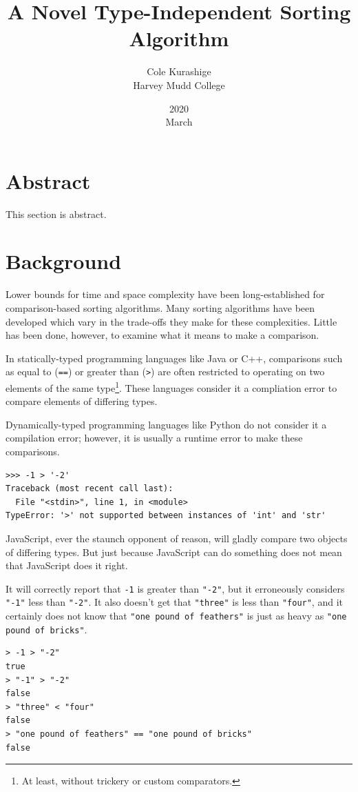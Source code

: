 \documentclass{article}
\title{A Novel Type-Independent Sorting Algorithm}
\author{Cole Kurashige \\ Harvey Mudd College}
\date{2020 \\ March}
\begin{document}
\section{Abstract}
This section is abstract.

\section{Background}
Lower bounds for time and space complexity have been long-established for
comparison-based sorting algorithms. Many sorting algorithms have been developed
which vary in the trade-offs they make for these complexities. Little has been
done, however, to examine what it means to make a comparison.

In statically-typed programming languages like Java or C++, comparisons such as
equal to (\texttt{==}) or greater than (\texttt{>}) are often restricted to
operating on two elements of the same type\footnote{At least, without trickery
  or custom comparators.}. These languages consider it a compliation error
to compare elements of differing types.

Dynamically-typed programming languages like Python do not consider it a
compilation error; however, it is usually a runtime error to make these
comparisons.

\begin{lstlisting}[caption = Comparisons in Python 3.7.6]
>>> -1 > '-2'
Traceback (most recent call last):
  File "<stdin>", line 1, in <module>
TypeError: '>' not supported between instances of 'int' and 'str'
\end{lstlisting}

JavaScript, ever the staunch opponent of reason, will gladly compare two objects
of differing types. But just because JavaScript can do something does not mean
that JavaScript does it right.

It will correctly report that \texttt{-1} is greater than \texttt{"-2"}, but it
erroneously considers \texttt{"-1"} less than \texttt{"-2"}. It also doesn't get
that \texttt{"three"} is less than \texttt{"four"}, and it certainly does not
know that \texttt{"one pound of feathers"} is just as heavy as \texttt{"one
  pound of bricks"}.

\begin{lstlisting}[caption = Comparisons in JavaScript (Node.js 12.12.0)]
> -1 > "-2"
true
> "-1" > "-2"
false
> "three" < "four"
false
> "one pound of feathers" == "one pound of bricks"
false
\end{lstlisting}
\end{document}
